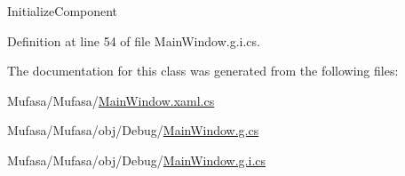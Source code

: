 Initialize\+Component 



Definition at line 54 of file Main\+Window.\+g.\+i.\+cs.



The documentation for this class was generated from the following files\+:\begin{DoxyCompactItemize}
\item 
Mufasa/\+Mufasa/\hyperlink{_main_window_8xaml_8cs}{Main\+Window.\+xaml.\+cs}\item 
Mufasa/\+Mufasa/obj/\+Debug/\hyperlink{_main_window_8g_8cs}{Main\+Window.\+g.\+cs}\item 
Mufasa/\+Mufasa/obj/\+Debug/\hyperlink{_main_window_8g_8i_8cs}{Main\+Window.\+g.\+i.\+cs}\end{DoxyCompactItemize}
